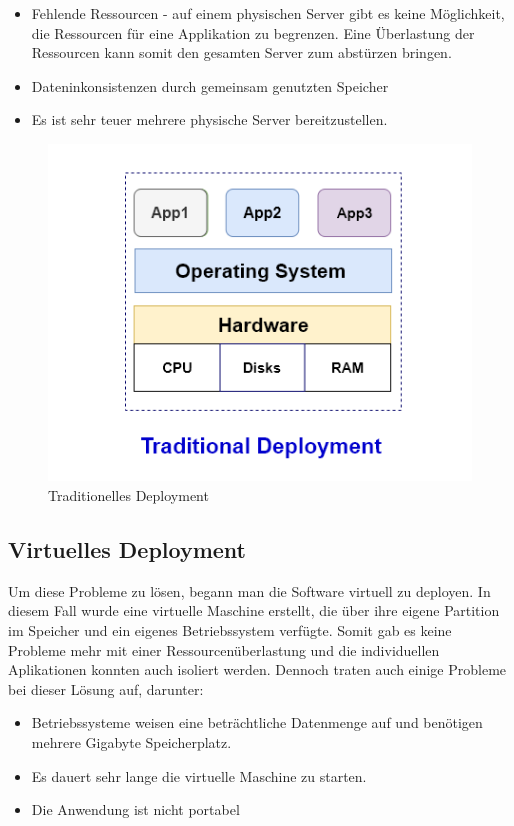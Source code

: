 \begin{itemize}
    \item Fehlende Ressourcen - auf einem physischen Server gibt es keine Möglichkeit, die Ressourcen für eine Applikation zu begrenzen. Eine Überlastung der Ressourcen kann somit den gesamten Server zum abstürzen bringen.
    \item Dateninkonsistenzen durch gemeinsam genutzten Speicher
    \item Es ist sehr teuer mehrere physische Server bereitzustellen.
\end{itemize}

\begin{figure}[h]
    \centering
    \includegraphics[width=0.7\linewidth]{pics/traditionelles-deployment.png}
    \caption{Traditionelles Deployment}
    \label{fig:enter-label}
\end{figure}


\cite{Traditional_vs_Container_vs_Virtuell_Deployment}

\newpage
\subsection{Virtuelles Deployment}
Um diese Probleme zu lösen, begann man die Software virtuell zu deployen. In diesem Fall wurde eine virtuelle Maschine erstellt, die über ihre eigene Partition im Speicher und ein eigenes Betriebssystem verfügte. Somit gab es keine Probleme mehr mit einer Ressourcenüberlastung und die individuellen Aplikationen konnten auch isoliert werden. Dennoch traten auch einige Probleme bei dieser Lösung auf, darunter:

\begin{itemize}
\item Betriebssysteme weisen eine beträchtliche Datenmenge auf und benötigen mehrere Gigabyte Speicherplatz.
\item Es dauert sehr lange die virtuelle Maschine zu starten.
\item  Die Anwendung ist nicht portabel
\end{itemize}

